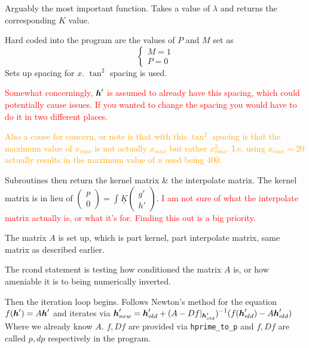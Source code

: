 Arguably the most important function. Takes a value of $\lambda$ and
returns the corresponding $K$ value.

Hard coded into the program are the values of $P$ and $M$ set as
\[ \left\{ \begin{array}{c} M=1 \\ P=0 \end{array} \right. \]
Sets up spacing for $x$. $\tan^2$ spacing is used.

\textcolor{red}{Somewhat concerningly, $\boldsymbol{h}'$ is assumed to 
already have this spacing, which could potentially cause issues.
If you wanted to change the spacing you would have to do it in
two different places.}

\textcolor{orange}{Also a cause for concern, or note is that 
with this $\tan^2$ spacing is that the maximum value of $x_{max}$
is not actually $x_{max}$ but rather $x_{max}^2$. I.e. using 
$x_{max}=20$ actually results in the maximum value of $x$ used 
being 400.}

Subroutines then return the kernel matrix \& the interpolate matrix.
The kernel matrix is in lieu of $\displaystyle \left( \begin{array}{c}
p \\ 0 \end{array} \right) = \int \underline{\underline{K}} \left(
\begin{array}{c} g' \\ h' \end{array} \right) $.
\textcolor{red}{I am not sure of what the interpolate matrix actually
is, or what it's for. Finding this out is a big priority.}

The matrix $A$ is set up, which is part kernel, part interpolate matrix,
same matrix as described earlier.

The rcond statement is testing how conditioned the matrix $A$ is, or how 
ameniable it is to being numerically inverted. 

Then the iteration loop begins. Follows Newton's method for the equation
$f(\boldsymbol{h}') = A \boldsymbol{h}'$ and iterates via $\displaystyle \boldsymbol{h}'_{new} =
\boldsymbol{h}'_{old} + (A-Df|_{\boldsymbol{h}_{old}'})^{-1}(f(\boldsymbol{h}_{old}') - A\boldsymbol{h}_{old}')$
Where we already know $A$. $f, Df$ are provided via \texttt{hprime\_to\_p}
and $f, Df$ are called $p, dp$ respectively in the program.
